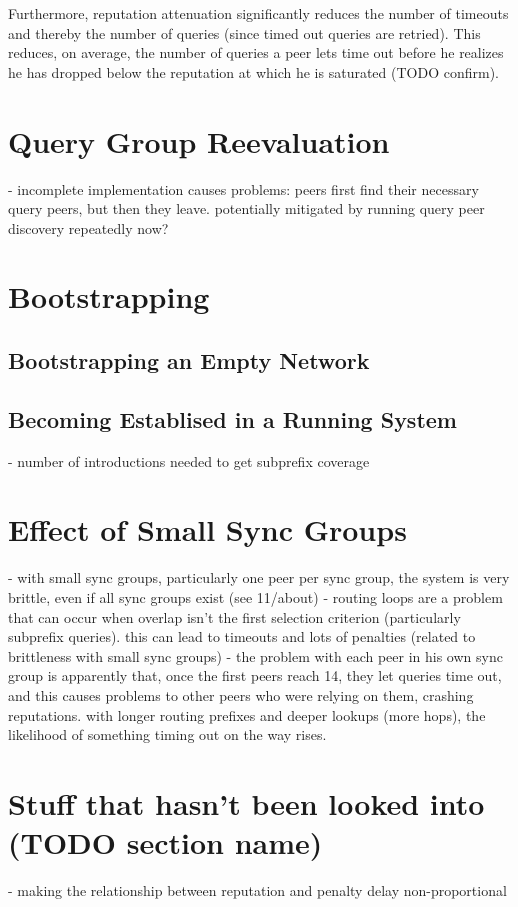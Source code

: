 Furthermore, reputation attenuation significantly reduces the number of timeouts
and thereby the number of queries (since timed out queries are retried). This
reduces, on average, the number of queries a peer lets time out before he
realizes he has dropped below the reputation at which he is saturated (TODO
confirm).

\section{Query Group Reevaluation}
\label{sec:rep_avail_group_reeval}
- incomplete implementation causes problems: peers first find their necessary
  query peers, but then they leave. potentially mitigated by running query peer
  discovery repeatedly now?

\section{Bootstrapping}
\label{sec:rep_avail_bootstrapping}
\subsection{Bootstrapping an Empty Network}
\subsection{Becoming Establised in a Running System}
- number of introductions needed to get subprefix coverage

\section{Effect of Small Sync Groups}
- with small sync groups, particularly one peer per sync group, the system is
  very brittle, even if all sync groups exist (see 11/about)
- routing loops are a problem that can occur when overlap isn't the first
  selection criterion (particularly subprefix queries). this can lead to
  timeouts and lots of penalties (related to brittleness with small sync groups)
- the problem with each peer in his own sync group is apparently that, once the
  first peers reach 14, they let queries time out, and this causes problems to
  other peers who were relying on them, crashing reputations. with longer
  routing prefixes and deeper lookups (more hops), the likelihood of something
  timing out on the way rises.

\section{Stuff that hasn't been looked into (TODO section name)}
- making the relationship between reputation and penalty delay non-proportional

